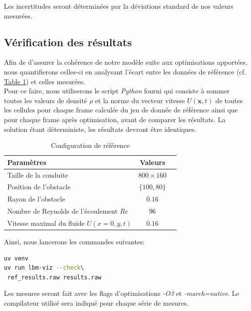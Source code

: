 Les incertitudes seront déterminées par la déviations standard de nos valeurs mesurées.
\subsection{Vérification des résultats}

Afin de d'assurer la cohérence de notre modèle suite aux optimisations apportées, nous quantifierons celles-ci en analysant l'écart entre les données de référence (cf. \hyperref[tab:reference]{Table 1}) et celles mesurées.\\
Pour ce faire, nous utiliserons le script \textit{Python} fourni qui consiste à sommer toutes les valeurs de densité $\rho$ et la norme du vecteur vitesse $U(\textbf{x},t)$ de toutes les cellules pour chaque frame calculée du jeu de donnée de référence ainsi que pour chaque frame après optimisation, avant de comparer les résultats. La solution étant déterministe, les résultats devront être identiques.\\
\begin{table}[H]
  \centering
  \caption{Configuration de référence}
  \label{tab:reference}
  \begin{tabular}{lcc}
    \toprule
    \textbf{Paramètres} & \textbf{Valeurs} \\
    \midrule
    Taille de la conduite 		   & $800\times160$ \\
    Position de l'obstacle         & $\{100, 80\}$ \\
    Rayon de l'obstacle  		   & $0.16$ \\
    Nombre de Reynolds de l'écoulement $Re$ & $96$ \\
    Vitesse maximal du fluide $U(x=0,y,t)$ & $0.16$ \\
    \bottomrule
  \end{tabular}
\end{table}

Ainsi, nous lancerons les commandes suivantes:
\begin{lstlisting}[language = bash]
uv venv
uv run lbm-viz --check\
 ref_results.raw results.raw	
\end{lstlisting}

Les mesures seront fait avec les flags d'optimisations \textit{-O3} et \textit{-march=native}. Le compilateur utilisé sera indiqué pour chaque série de mesures.